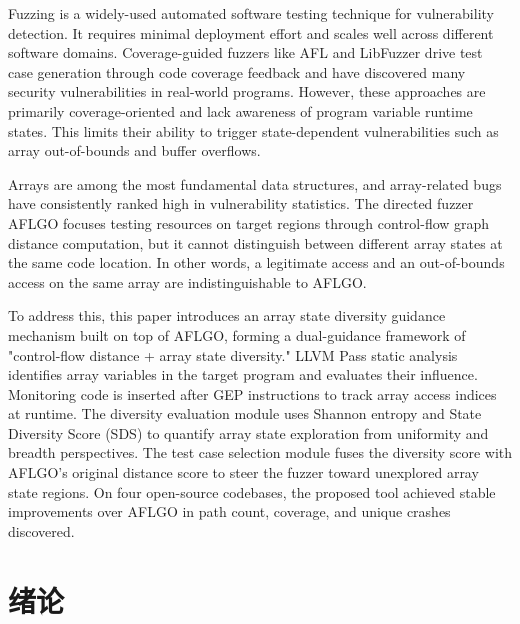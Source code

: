 \documentclass[bachelor]{njupthesis}
\begin{document}
\begin{englishabstract}
Fuzzing is a widely-used automated software testing technique for vulnerability detection. It requires minimal deployment effort and scales well across different software domains. Coverage-guided fuzzers like AFL and LibFuzzer drive test case generation through code coverage feedback and have discovered many security vulnerabilities in real-world programs. However, these approaches are primarily coverage-oriented and lack awareness of program variable runtime states. This limits their ability to trigger state-dependent vulnerabilities such as array out-of-bounds and buffer overflows.

Arrays are among the most fundamental data structures, and array-related bugs have consistently ranked high in vulnerability statistics. The directed fuzzer AFLGO focuses testing resources on target regions through control-flow graph distance computation, but it cannot distinguish between different array states at the same code location. In other words, a legitimate access and an out-of-bounds access on the same array are indistinguishable to AFLGO.

To address this, this paper introduces an array state diversity guidance mechanism built on top of AFLGO, forming a dual-guidance framework of "control-flow distance + array state diversity." LLVM Pass static analysis identifies array variables in the target program and evaluates their influence. Monitoring code is inserted after GEP instructions to track array access indices at runtime. The diversity evaluation module uses Shannon entropy and State Diversity Score (SDS) to quantify array state exploration from uniformity and breadth perspectives. The test case selection module fuses the diversity score with AFLGO's original distance score to steer the fuzzer toward unexplored array state regions. On four open-source codebases, the proposed tool achieved stable improvements over AFLGO in path count, coverage, and unique crashes discovered.

\end{englishabstract}

\thesistableofcontents

\thesischapterexordium

\chapter{绪论}
\end{document}
